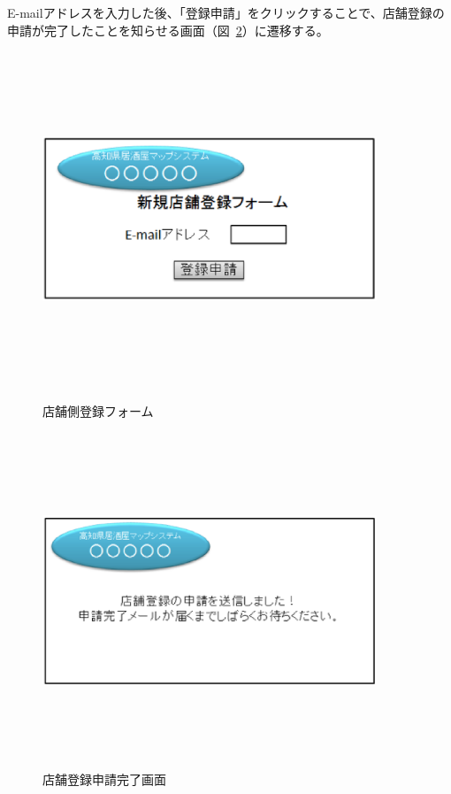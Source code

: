 E-mailアドレスを入力した後、「登録申請」をクリックすることで、店舗登録の申請が完了したことを知らせる画面（図~\ref{fig:26}）に遷移する。



\begin {figure}[!htbp]
    \begin{center}
    \includegraphics [height=10cm, width=10cm]{25.eps}
　　    \caption {店舗側登録フォーム}
    \label {fig:25}
    \end{center}
\end {figure}



\begin {figure}[!htbp]
    \begin{center}
    \includegraphics [height=10cm, width=10cm]{26.eps}
    \caption {店舗登録申請完了画面}
    \label {fig:26}
    \end{center}
\end {figure}



